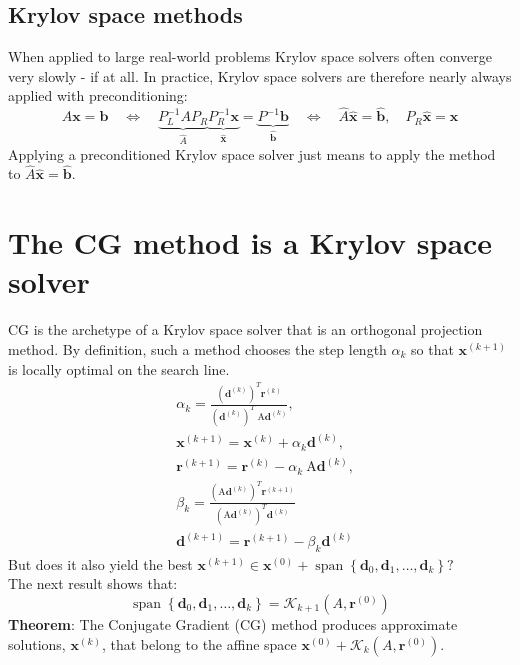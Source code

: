 \documentclass[11pt]{book}
\begin{document}
\subsection*{Krylov space methods}
When applied to large real-world problems Krylov space solvers often converge very slowly - if at all. In practice, Krylov space solvers are therefore nearly always applied with preconditioning:
$$
A \mathbf{x}=\mathbf{b} \quad \Longleftrightarrow \quad \underbrace{P^{-1}_L A P_R}_{\hat{A}} \underbrace{P^{-1}_R\mathbf{x}}_{\hat{\mathbf{x}}}=\underbrace{P^{-1} \mathbf{b}}_{\hat{\mathbf{b}}} \quad \Longleftrightarrow \quad \hat{A} \hat{\mathbf{x}}=\hat{\mathbf{b}}, \quad P_R \hat{\mathbf{x}}=\mathbf{x}
$$
Applying a preconditioned Krylov space solver just means to apply the method to $\hat{A} \hat{\mathbf{x}}=\hat{\mathbf{b}}$.
\section*{The CG method is a Krylov space solver}
CG is the archetype of a Krylov space solver that is an orthogonal projection method. By definition, such a method chooses the step length $\alpha_{k}$ so that $\mathbf{x}^{(k+1)}$ is locally optimal on the search line.
$$
\begin{aligned}
& \alpha_{k}=\frac{\left(\mathbf{d}^{(k)}\right)^{T} \mathbf{r}^{(k)}}{\left(\mathbf{d}^{(k)}\right)^{T} \mathrm{~A} \mathbf{d}^{(k)}}, \\
& \mathbf{x}^{(k+1)}=\mathbf{x}^{(k)}+\alpha_{k} \mathbf{d}^{(k)}, \\
& \mathbf{r}^{(k+1)}=\mathbf{r}^{(k)}-\alpha_{k} \mathrm{~A} \mathbf{d}^{(k)}, \\
& \beta_{k}=\frac{\left(\mathrm{A} \mathbf{d}^{(k)}\right)^{T} \mathbf{r}^{(k+1)}}{\left(\mathrm{A}\mathbf{d}^{(k)}\right)^{T} \mathbf{d}^{(k)}} \\
& \mathbf{d}^{(k+1)}=\mathbf{r}^{(k+1)}-\beta_{k} \mathbf{d}^{(k)}
\end{aligned}
$$
But does it also yield the best $
\mathbf{x}^{(k+1)} \in \mathbf{x}^{(0)}+\operatorname{span}\left\{\mathbf{d}_{0}, \mathbf{d}_{1}, \ldots, \mathbf{d}_{k}\right\} ?
$\\ 
The next result shows that:
$$
\operatorname{span}\left\{\mathbf{d}_{0}, \mathbf{d}_{1}, \ldots, \mathbf{d}_{k}\right\}=\mathscr{K}_{k+1}\left(A, \mathbf{r}^{(0)}\right)
$$
\textbf{Theorem}: The Conjugate Gradient (CG) method produces approximate solutions, $\mathbf{x}^{(k)}$, that belong to the affine space $\mathbf{x}^{(0)}+\mathscr{K}_{k}\left(A, \mathbf{r}^{(0)}\right)$.\\ \\
\end{document}
